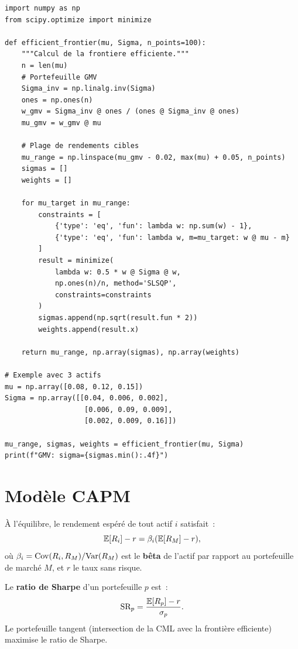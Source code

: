 \begin{codeblock}[title=\textbf{Fronti\`ere efficiente de Markowitz}]
\begin{verbatim}
import numpy as np
from scipy.optimize import minimize

def efficient_frontier(mu, Sigma, n_points=100):
    """Calcul de la frontiere efficiente."""
    n = len(mu)
    # Portefeuille GMV
    Sigma_inv = np.linalg.inv(Sigma)
    ones = np.ones(n)
    w_gmv = Sigma_inv @ ones / (ones @ Sigma_inv @ ones)
    mu_gmv = w_gmv @ mu

    # Plage de rendements cibles
    mu_range = np.linspace(mu_gmv - 0.02, max(mu) + 0.05, n_points)
    sigmas = []
    weights = []

    for mu_target in mu_range:
        constraints = [
            {'type': 'eq', 'fun': lambda w: np.sum(w) - 1},
            {'type': 'eq', 'fun': lambda w, m=mu_target: w @ mu - m}
        ]
        result = minimize(
            lambda w: 0.5 * w @ Sigma @ w,
            np.ones(n)/n, method='SLSQP',
            constraints=constraints
        )
        sigmas.append(np.sqrt(result.fun * 2))
        weights.append(result.x)

    return mu_range, np.array(sigmas), np.array(weights)

# Exemple avec 3 actifs
mu = np.array([0.08, 0.12, 0.15])
Sigma = np.array([[0.04, 0.006, 0.002],
                   [0.006, 0.09, 0.009],
                   [0.002, 0.009, 0.16]])

mu_range, sigmas, weights = efficient_frontier(mu, Sigma)
print(f"GMV: sigma={sigmas.min():.4f}")
\end{verbatim}
\end{codeblock}

\section{Mod\`ele CAPM}

\begin{theoreme}
\`A l'\'equilibre, le rendement esp\'er\'e de tout actif $i$ satisfait~:
\[
    \mathbb{E}[R_i] - r = \beta_i(\mathbb{E}[R_M] - r),
\]
o\`u $\beta_i = \mathrm{Cov}(R_i, R_M)/\mathrm{Var}(R_M)$ est le \textbf{b\^eta} de l'actif
par rapport au portefeuille de march\'e $M$, et $r$ le taux sans risque.
\end{theoreme}

\begin{definition}
Le \textbf{ratio de Sharpe} d'un portefeuille $p$ est~:
\[
    \text{SR}_p = \frac{\mathbb{E}[R_p] - r}{\sigma_p}.
\]
Le portefeuille tangent (intersection de la CML avec la fronti\`ere
efficiente) maximise le ratio de Sharpe.
\end{definition}

